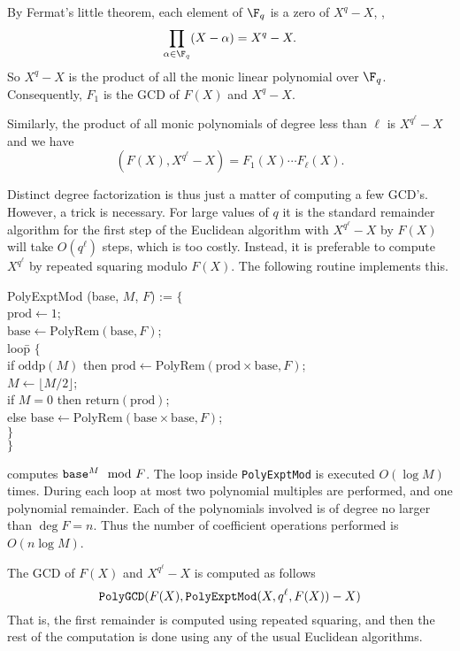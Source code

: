 By Fermat's little theorem, each element of $\F_q$ is a zero of $X^q-
X$, \ie, 
\[
\prod_{\alpha \in \F_q} (X - \alpha) = X^q - X.
\]
So $X^q- X$ is the product of all the monic linear polynomial over
$\F_q$.  Consequently, $F_1$ is the GCD of $F(X)$ and $X^q - X$.

Similarly, the product of all monic polynomials of degree less than
$\ell$ is $X^{q^\ell} -X$ and we have
\[
(F(X), X^{q^{\ell}} - X) = F_1(X) \cdots F_{\ell}(X).
\]

Distinct degree factorization is thus just a matter of computing a few
GCD's.  However, a trick is necessary.  For large values of $q$ it is
the standard remainder algorithm for the first step of the Euclidean
algorithm with $X^{q^{\ell}}-X$ by $F(X)$ will take $O(q^{\ell})$
steps, which is too costly.  Instead, it is preferable to compute
$X^{q^{\ell}}$ by repeated squaring modulo $F(X)$.  The following
routine implements this.

\begindsacode
PolyExptMod (base, $M$, $F$) := $\{$ \\
\> $\mbox{prod} \leftarrow 1$; \\
\> $\mbox{base} \leftarrow \mbox{PolyRem}(\mbox{base}, F)$; \\
\> loo\=p $\{$\\
\>\> if $\mbox{oddp}(M)$ then $\mbox{prod} \leftarrow \mbox{PolyRem}(\mbox{prod} \times \mbox{base}, F)$;\\
\>\> $M \leftarrow \lfloor M/2 \rfloor$; \\
\>\> if $M = 0$ then $\mbox{return}(\mbox{prod})$;\\
\>\> else $\mbox{base} \leftarrow \mbox{PolyRem}(\mbox{base}
  \times\mbox{base}, F)$; \\
\>\> $\}$\\
\>$\}$
\enddsacode

 computes $\mbox{\tt base}^M \mod{F}$.  The loop
inside {\tt PolyExptMod} is executed $O(\log M)$ times.  During each
loop at most two polynomial multiples are performed, and one
polynomial remainder.  Each of the polynomials involved is of degree
no larger than $\deg F = n$.  Thus the number of coefficient
operations performed is $O(n\log M)$.

The GCD of $F(X)$ and $X^{q^\ell} -X$ is computed as follows
\[
\mbox{\tt PolyGCD}(F(X), \mbox{\tt PolyExptMod}(X, q^{\ell}, F(X)) - X)
\]
That is, the first remainder is computed using repeated squaring, and
then the rest of the computation is done using any of the usual
Euclidean algorithms.  

